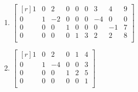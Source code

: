 \documentclass[12pt]{article}
\begin{document}
\begin{enumerate}
\item
$\begin{bmatrix*}[r]
1 & 0 &  2 & 0 & 0 & 0 &  3 &  4 & 9\\
0 & 1 & -2 & 0 & 0 & 0 & -4 &  0 & 0\\
0 & 0 &  0 & 1 & 0 & 0 &  0 & -1 & 7\\
0 & 0 &  0 & 0 & 1 & 3 &  2 &  2 & 8\\
\end{bmatrix*}$

\item
$\begin{bmatrix*}[r]
1 & 0 &  2 & 0 & 1 & 4\\
0 & 1 & -4 & 0 & 0 & 3\\
0 & 0 &  0 & 1 & 2 & 5\\
0 & 0 &  0 & 0 & 0 & 1\\
\end{bmatrix*}$




\end{enumerate}
\end{document}
